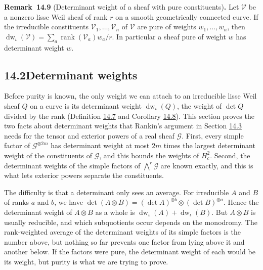 \documentclass[11pt]{article}
\newenvironment{bpstatement}[2]{\par\addvspace{0.6\baselineskip}\noindent\textbf{#1}#2\textbf{.}\enspace\ignorespaces}
  {\par\addvspace{0.4\baselineskip}}
\begin{document}
\label{bp68}%
\begin{bpstatement}{Remark~14.9}{ (Determinant weight of a sheaf with pure constituents)}
Let \(\mathcal V\) be a nonzero lisse Weil sheaf of rank \(r\) on a smooth geometrically connected curve. If the irreducible constituents \(\mathcal V_1,\dots,\mathcal V_n\) of \(\mathcal V\) are pure of weights \(w_1,\dots,w_n\), then \(\operatorname{dw}_\iota(\mathcal V)=\sum_a\operatorname{rank}(\mathcal V_a)w_a/r\). In particular a sheaf pure of weight \(w\) has determinant weight \(w\).
\end{bpstatement}



\subsection*{\texorpdfstring{14.2\quad Determinant weights}{14.2 Determinant weights}}
\label{bp69}%
\label{bp70}%
Before purity is known, the only weight we can attach to an irreducible lisse Weil sheaf \(Q\) on a curve is its determinant weight \(\operatorname{dw}_\iota(Q)\), the weight of \(\det Q\) divided by the rank (Definition \hyperref[bp64]{14.7} and Corollary \hyperref[bp65]{14.8}). This section proves the two facts about determinant weights that Rankin's argument in Section \hyperref[bp102]{14.3} needs for the tensor and exterior powers of a real sheaf \(\mathcal G\). First, every simple factor of \(\mathcal G^{\otimes2m}\) has determinant weight at most \(2m\) times the largest determinant weight of the constituents of \(\mathcal G\), and this bounds the weights of \(H^2_c\). Second, the determinant weights of the simple factors of \(\bigwedge^r\mathcal G\) are known exactly, and this is what lets exterior powers separate the constituents.

The difficulty is that a determinant only sees an average. For irreducible \(A\) and \(B\) of ranks \(a\) and \(b\), we have \(\det(A\otimes B)=(\det A)^{\otimes b}\otimes(\det B)^{\otimes a}\). Hence the determinant weight of \(A\otimes B\) as a whole is \(\operatorname{dw}_\iota(A)+\operatorname{dw}_\iota(B)\). But \(A\otimes B\) is usually reducible, and which subquotients occur depends on the monodromy. The rank-weighted average of the determinant weights of its simple factors is the number above, but nothing so far prevents one factor from lying above it and another below. If the factors were pure, the determinant weight of each would be its weight, but purity is what we are trying to prove.
\end{document}
